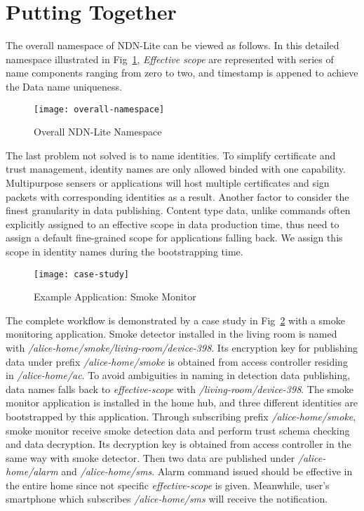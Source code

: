 \section{Putting Together}
\label{sec:putting-together}

The overall namespace of NDN-Lite can be viewed as follows.
In this detailed namespace illustrated in Fig~\ref{fig:overall-namespace}, \textit{Effective scope} are represented with series of name components ranging from zero to two, and timestamp is appened to achieve the Data name uniqueness.

\begin{figure}[!h]
    \centering
    \texttt{[image: overall-namespace]}
    \caption{Overall NDN-Lite Namespace}
    \label{fig:overall-namespace}
\end{figure}

The last problem not solved is to name identities.
To simplify certificate and trust management, identity names are only allowed binded with one capability.
Multipurpose sensers or applications will host multiple certificates and sign packets with corresponding identities as a result.
Another factor to consider the finest granularity in data publishing.
Content type data, unlike commands often explicitly assigned to an effective scope in data production time, thus need to assign a default fine-grained scope for applications falling back.
We assign this scope in identity names during the bootstrapping time.

\begin{figure}[!h]
    \centering
    \texttt{[image: case-study]}
    \caption{Example Application: Smoke Monitor}
    \label{fig:case-study}
\end{figure}

The complete workflow is demonstrated by a case study in Fig~\ref{fig:case-study} with a smoke monitoring application.
Smoke detector installed in the living room is named with \textsl{/alice-home/smoke/living-room/device-398}.
Its encryption key for publishing data under prefix \textsl{/alice-home/smoke} is obtained from access controller residing in \textsl{/alice-home/ac}.
To avoid ambiguities in naming in detection data publishing, data names falls back to \textit{effective-scope} with \textsl{/living-room/device-398}.
The smoke monitor application is installed in the home hub, and three different identities are bootstrapped by this application.
Through subscribing prefix \textsl{/alice-home/smoke}, smoke monitor receive smoke detection data and perform trust schema checking and data decryption.
Its decryption key is obtained from access controller in the same way with smoke detector.
Then two data are published under \textsl{/alice-home/alarm} and \textsl{/alice-home/sms}.
Alarm command issued should be effective in the entire home since not specific \textit{effective-scope} is given.
Meanwhile, user's smartphone which subscribes \textsl{/alice-home/sms} will receive the notification.